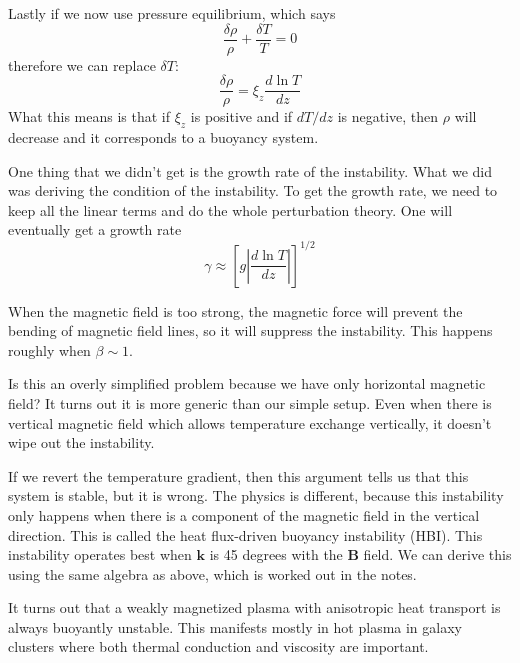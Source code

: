\documentclass[letterpaper, 11pt]{article}
\numberwithin{equation}{section}
\numberwithin{figure}{section}
\begin{document}
Lastly if we now use pressure equilibrium, which says
\begin{equation}
  \label{eq:37}
  \frac{\delta\rho}{\rho} + \frac{\delta T}{T} = 0
\end{equation}
therefore we can replace $\delta T$:
\begin{equation}
  \label{eq:38}
  \frac{\delta \rho}{\rho} = \xi_z\frac{d\ln T}{dz}
\end{equation}
What this means is that if $\xi_z$ is positive and if $dT/dz$ is negative, then
$\rho$ will decrease and it corresponds to a buoyancy system.

One thing that we didn't get is the growth rate of the instability. What we did
was deriving the condition of the instability. To get the growth rate, we need
to keep all the linear terms and do the whole perturbation theory. One will
eventually get a growth rate
\begin{equation}
  \label{eq:39}
  \gamma \approx \left[ g \left| \frac{d\ln T}{dz} \right| \right]^{1/2}
\end{equation}

When the magnetic field is too strong, the magnetic force will prevent the
bending of magnetic field lines, so it will suppress the instability. This
happens roughly when $\beta \sim 1$.

Is this an overly simplified problem because we have only horizontal magnetic
field? It turns out it is more generic than our simple setup. Even when there is
vertical magnetic field which allows temperature exchange vertically, it doesn't
wipe out the instability.

If we revert the temperature gradient, then this argument tells us that this
system is stable, but it is wrong. The physics is different, because this
instability only happens when there is a component of the magnetic field in the
vertical direction. This is called the heat flux-driven buoyancy instability
(HBI). This instability operates best when $\mathbf{k}$ is 45 degrees with the
$\mathbf{B}$ field. We can derive this using the same algebra as above, which is
worked out in the notes.

It turns out that a weakly magnetized plasma with anisotropic heat transport is
always buoyantly unstable. This manifests mostly in hot plasma in galaxy
clusters where both thermal conduction and viscosity are important.
\end{document}
